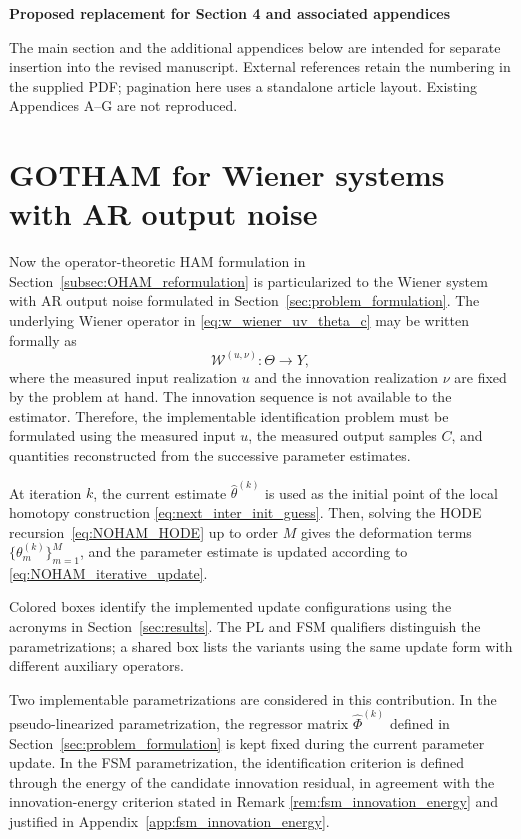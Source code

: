 \documentclass[11pt]{article}
\theoremstyle{remark}
\begin{document}
\begin{center}
{\large\bfseries Proposed replacement for Section 4 and associated appendices}
\end{center}
\noindent The main section and the additional appendices below are intended
for separate insertion into the revised manuscript. External references
retain the numbering in the supplied PDF; pagination here uses a standalone
article layout. Existing Appendices A--G are not reproduced.
\medskip
\setcounter{section}{3}
\setcounter{equation}{38}
\setcounter{table}{1}
\section{GOTHAM for Wiener systems with AR output noise}
\label{sec:GOTHAM_for_WS_AR_noise}

Now the operator-theoretic HAM formulation in Section~\ref{subsec:OHAM_reformulation} is particularized to the Wiener system with AR output noise formulated in Section~\ref{sec:problem_formulation}. The underlying Wiener operator in \eqref{eq:w_wiener_uv_theta_c} may be written formally as
\begin{equation}
    \mathcal{W}^{(u,\nu)}:\Theta\to Y,
\end{equation}
where the measured input realization $u$ and the innovation realization $\nu$ are fixed by the problem at hand. The innovation sequence is not available to the estimator. Therefore, the implementable identification problem must be formulated using the measured input $u$, the measured output samples $C$, and quantities reconstructed from the successive parameter estimates.

At iteration $k$, the current estimate $\hat{\theta}^{(k)}$ is used as the initial point of the local homotopy construction \eqref{eq:next_inter_init_guess}. Then, solving the HODE recursion~\eqref{eq:NOHAM_HODE} up to order $M$ gives the deformation terms $\{\theta_m^{(k)}\}_{m=1}^{M}$, and the parameter estimate is updated according to \eqref{eq:NOHAM_iterative_update}.

Colored boxes identify the implemented update configurations using the
acronyms in Section~\ref{sec:results}. The PL and FSM qualifiers distinguish
the parametrizations; a shared box lists the variants using the same
update form with different auxiliary operators.

Two implementable parametrizations are considered in this contribution. In the pseudo-linearized parametrization, the regressor matrix $\hat{\Phi}^{(k)}$ defined in Section~\ref{sec:problem_formulation} is kept fixed during the current parameter update. In the FSM parametrization, the identification criterion is defined through the energy of the candidate innovation residual, in agreement with the innovation-energy criterion stated in Remark \ref{rem:fsm_innovation_energy} and justified in Appendix~\ref{app:fsm_innovation_energy}.
\end{document}
